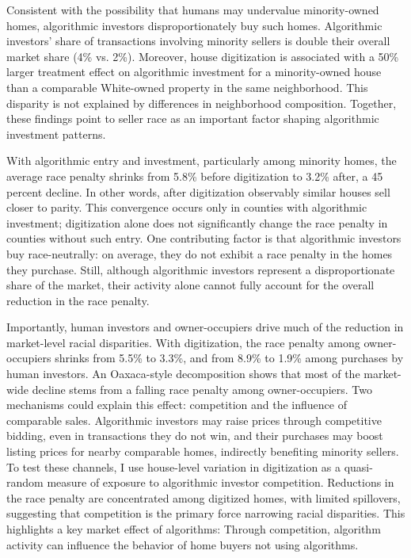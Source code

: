 \documentclass[11pt]{article}
\begin{document}
Consistent with the possibility that humans may undervalue minority-owned homes, algorithmic investors disproportionately buy such homes. Algorithmic investors’ share of transactions involving minority sellers is double their overall market share (4\% vs. 2\%). Moreover, house digitization is associated with a 50\% larger treatment effect on algorithmic investment for a minority-owned house than a comparable White-owned property in the same neighborhood. This disparity is not explained by differences in neighborhood composition. Together, these findings point to seller race as an important factor shaping algorithmic investment patterns.


With algorithmic entry and investment, particularly among minority homes, the average race penalty shrinks from 5.8\% before digitization to 3.2\% after, a 45 percent decline. In other words, after digitization observably similar houses sell closer to parity. This convergence occurs only in counties with algorithmic investment; digitization alone does not significantly change the race penalty in counties without such entry. One contributing factor is that algorithmic investors buy race-neutrally: on average, they do not exhibit a race penalty in the homes they purchase. Still, although algorithmic investors represent a disproportionate share of the market, their activity alone cannot fully account for the overall reduction in the race penalty.

Importantly, human investors and owner-occupiers drive much of the reduction in market-level racial disparities. With digitization, the race penalty among owner-occupiers shrinks from 5.5\% to 3.3\%, and from 8.9\% to 1.9\% among purchases by human investors. An Oaxaca-style decomposition shows that most of the market-wide decline stems from a falling race penalty among owner-occupiers. Two mechanisms could explain this effect: competition and the influence of comparable sales. Algorithmic investors may raise prices through competitive bidding, even in transactions they do not win, and their purchases may boost listing prices for nearby comparable homes, indirectly benefiting minority sellers. To test these channels, I use house-level variation in digitization as a quasi-random measure of exposure to algorithmic investor competition. Reductions in the race penalty are concentrated among digitized homes, with limited spillovers, suggesting that competition is the primary force narrowing racial disparities. 
This highlights a key market effect of algorithms: Through competition, algorithm activity can influence the behavior of home buyers not using algorithms. 
\end{document}
